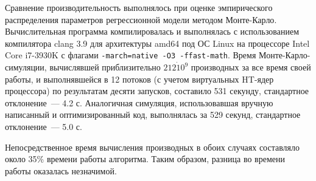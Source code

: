 \documentclass[11pt,a4paper]{article}
\begin{document}
Сравнение производительность выполнялось при оценке эмпирического распределения
параметров регрессионной модели методом Монте-Карло\cite{Rudoy15MonteCarlo}.
Вычислительная программа компилировалась и выполнялась с использованием компилятора
clang 3.9 для архитектуры amd64 под ОС Linux на процессоре Intel Core i7-3930K
с флагами \texttt{-march=native -O3 -ffast-math}. Время Монте-Карло-симуляции,
вычислявшей приблизительно $212 \dot 10^9$ производных за все время своей работы,
и выполнявшейся в 12 потоков (с учетом виртуальных HT-ядер процессора) по результатам
десяти запусков, составило 531 секунду, стандартное отклонение~--- 4.2 с.
Аналогичная симуляция, использовавшая вручную написанный и оптимизированный код,
выполнялась за 529 секунд, стандартное отклонение~--- 5.0 с.

Непосредственное время вычисления производных в обоих случаях составляло около
35\% времени работы алгоритма. Таким образом, разница во времени работы оказалась
незначимой.
\end{document}
